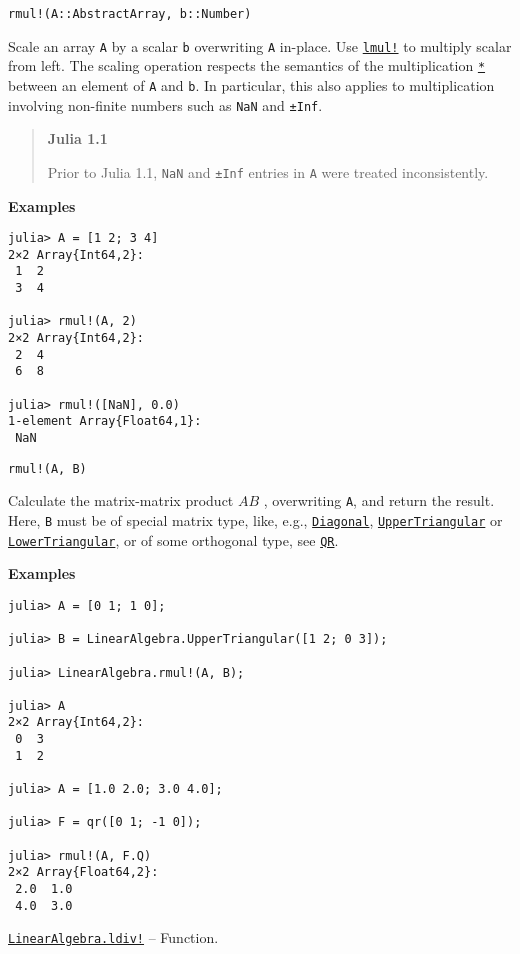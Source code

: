 \begin{adjustwidth}{2em}{0pt}


\begin{verbatim}
rmul!(A::AbstractArray, b::Number)
\end{verbatim}

Scale an array \texttt{A} by a scalar \texttt{b} overwriting \texttt{A} in-place.  Use \hyperlink{12404459690324241452}{\texttt{lmul!}} to multiply scalar from left.  The scaling operation respects the semantics of the multiplication \hyperlink{7592762607639177347}{\texttt{*}} between an element of \texttt{A} and \texttt{b}.  In particular, this also applies to multiplication involving non-finite numbers such as \texttt{NaN} and \texttt{±Inf}.

\begin{quote}
\textbf{Julia 1.1}

Prior to Julia 1.1, \texttt{NaN} and \texttt{±Inf} entries in \texttt{A} were treated inconsistently.

\end{quote}
\textbf{Examples}


\begin{verbatim}
julia> A = [1 2; 3 4]
2×2 Array{Int64,2}:
 1  2
 3  4

julia> rmul!(A, 2)
2×2 Array{Int64,2}:
 2  4
 6  8

julia> rmul!([NaN], 0.0)
1-element Array{Float64,1}:
 NaN
\end{verbatim}




\begin{lstlisting}
rmul!(A, B)
\end{lstlisting}

Calculate the matrix-matrix product  \(AB\) , overwriting \texttt{A}, and return the result. Here, \texttt{B} must be of special matrix type, like, e.g., \hyperlink{3300114559258360989}{\texttt{Diagonal}}, \hyperlink{6344726545165008167}{\texttt{UpperTriangular}} or \hyperlink{15116078732779234709}{\texttt{LowerTriangular}}, or of some orthogonal type, see \hyperlink{16913872014958777367}{\texttt{QR}}.

\textbf{Examples}


\begin{verbatim}
julia> A = [0 1; 1 0];

julia> B = LinearAlgebra.UpperTriangular([1 2; 0 3]);

julia> LinearAlgebra.rmul!(A, B);

julia> A
2×2 Array{Int64,2}:
 0  3
 1  2

julia> A = [1.0 2.0; 3.0 4.0];

julia> F = qr([0 1; -1 0]);

julia> rmul!(A, F.Q)
2×2 Array{Float64,2}:
 2.0  1.0
 4.0  3.0
\end{verbatim}



\end{adjustwidth}
\hypertarget{11817740014578453690}{} 
\hyperlink{11817740014578453690}{\texttt{LinearAlgebra.ldiv!}}  -- {Function.}

